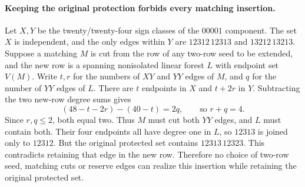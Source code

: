 \paragraph{Keeping the original protection forbids every matching insertion.}
Let $X,Y$ be the twenty/twenty-four sign classes of the $00001$
component. The set $X$ is independent, and the only edges within $Y$
are $12312\,12313$ and $13212\,13213$.
Suppose a matching $M$ is cut from the row of any two-row seed to be
extended, and the new row is a spanning nonisolated linear forest $L$
with endpoint set $V(M)$. Write $t,r$ for the numbers of $XY$ and $YY$
edges of $M$, and $q$ for the number of $YY$ edges of $L$.
There are $t$ endpoints in $X$ and $t+2r$ in $Y$. Subtracting the
two new-row degree sums gives
\[
(48-t-2r)-(40-t)=2q,\qquad\text{so }r+q=4.
\]
Since $r,q\le2$, both equal two. Thus $M$ must cut both $YY$ edges,
and $L$ must contain both. Their four endpoints all have degree one
in $L$, so $12313$ is joined only to $12312$.
But the original protected set contains $12313\,12323$.
This contradicts retaining that edge in the new row.
Therefore no choice of two-row seed, matching cuts or reserve edges
can realize this insertion while retaining the original protected set.

